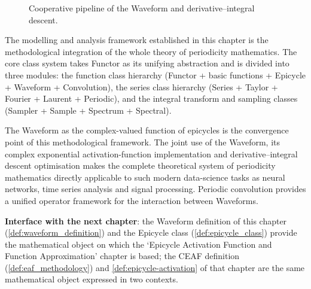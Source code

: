 \begin{figure}[htbp]
    \centering
    \caption{Cooperative pipeline of the Waveform and derivative--integral descent.}
    \label{fig:waveform_kdi_pipeline}
\end{figure}

\begin{remark}\label{rem:methodology_unity}
The modelling and analysis framework established in this chapter is the methodological integration of the whole theory of periodicity mathematics. The core class system takes Functor as its unifying abstraction and is divided into three modules: the function class hierarchy (Functor + basic functions + Epicycle + Waveform + Convolution), the series class hierarchy (Series + Taylor + Fourier + Laurent + Periodic), and the integral transform and sampling classes (Sampler + Sample + Spectrum + Spectral).

The Waveform as the complex-valued function of epicycles is the convergence point of this methodological framework. The joint use of the Waveform, its complex exponential activation-function implementation and derivative--integral descent optimisation makes the complete theoretical system of periodicity mathematics directly applicable to such modern data-science tasks as neural networks, time series analysis and signal processing. Periodic convolution provides a unified operator framework for the interaction between Waveforms.

\textbf{Interface with the next chapter}: the Waveform definition of this chapter (\cref{def:waveform_definition}) and the Epicycle class (\cref{def:epicycle_class}) provide the mathematical object on which the `Epicycle Activation Function and Function Approximation' chapter is based; the CEAF definition (\cref{def:eaf_methodology}) and \cref{def:epicycle-activation} of that chapter are the same mathematical object expressed in two contexts.
\end{remark}

